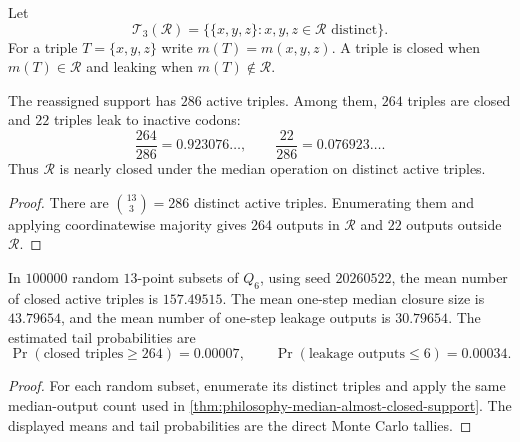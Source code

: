 \begin{definition}
\label{def:philosophy-active-median-leakage}
Let
$$
  \mathcal{T}_{3}(\mathcal{R})
  =
  \{\{x,y,z\}:x,y,z\in\mathcal{R}\text{ distinct}\}.
$$
For a triple $T=\{x,y,z\}$ write $m(T)=m(x,y,z)$. A triple is
closed when $m(T)\in\mathcal{R}$ and leaking when
$m(T)\notin\mathcal{R}$.
\end{definition}

\begin{theorem}
\label{thm:philosophy-median-almost-closed-support}
The reassigned support has $286$ active triples. Among them, $264$
triples are closed and $22$ triples leak to inactive codons:
$$
  \frac{264}{286}=0.923076\ldots,\qquad
  \frac{22}{286}=0.076923\ldots.
$$
Thus $\mathcal{R}$ is nearly closed under the median operation on
distinct active triples.
\end{theorem}
\begin{proof}
There are $\binom{13}{3}=286$ distinct active triples. Enumerating them
and applying coordinatewise majority gives $264$ outputs in
$\mathcal{R}$ and $22$ outputs outside $\mathcal{R}$.
\end{proof}


\begin{corollary}
\label{cor:philosophy-random-median-comparison}
In $100000$ random $13$-point subsets of $Q_{6}$, using seed
$20260522$, the mean number of closed active triples is $157.49515$.
The mean one-step median closure size is $43.79654$, and the mean
number of one-step leakage outputs is $30.79654$. The estimated
tail probabilities are
$$
  \Pr(\text{closed triples}\ge 264)=0.00007,
  \qquad
  \Pr(\text{leakage outputs}\le 6)=0.00034.
$$
\end{corollary}
\begin{proof}
For each random subset, enumerate its distinct triples and apply the
same median-output count used in
\autoref{thm:philosophy-median-almost-closed-support}. The displayed
means and tail probabilities are the direct Monte Carlo tallies.
\end{proof}

